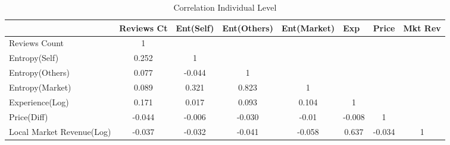 \begin{table}
\centering
\begin{tabular}{@{}lccccccc@{}}
\toprule
 & \multicolumn{1}{l}{Reviews Ct} & \multicolumn{1}{l}{Ent(Self)} & \multicolumn{1}{l}{Ent(Others)} & \multicolumn{1}{l}{Ent(Market)} & \multicolumn{1}{l}{Exp} & \multicolumn{1}{l}{Price} & \multicolumn{1}{l}{Mkt Rev} \\ \midrule
Reviews Count & 1 &  &  &  &  &  &  \\
Entropy(Self) & 0.252 & 1 &  &  &  &  &  \\
Entropy(Others) & 0.077 & -0.044 & 1 &  &  &  &  \\
Entropy(Market) & 0.089 & 0.321 & 0.823 & 1 &  &  &  \\
Experience(Log) & 0.171 & 0.017 & 0.093 & 0.104 & 1 &  &  \\
Price(Diff) & -0.044 & -0.006 & -0.030 & -0.01 & -0.008 & 1 &  \\
Local Market Revenue(Log) & -0.037 & -0.032 & -0.041 & -0.058 & 0.637 & -0.034 & 1 \\ \bottomrule
\end{tabular}
\caption{Correlation Individual Level}
\label{corr_ind}
\end{table}